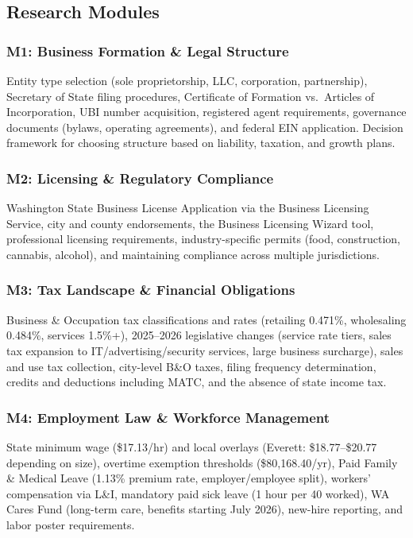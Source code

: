 \documentclass[11pt,letterpaper]{article}
\begin{document}
\subsection{Research Modules}

\subsubsection{M1: Business Formation \& Legal Structure}
Entity type selection (sole proprietorship, LLC, corporation, partnership), Secretary of State filing procedures, Certificate of Formation vs.\ Articles of Incorporation, UBI number acquisition, registered agent requirements, governance documents (bylaws, operating agreements), and federal EIN application. Decision framework for choosing structure based on liability, taxation, and growth plans.

\subsubsection{M2: Licensing \& Regulatory Compliance}
Washington State Business License Application via the Business Licensing Service, city and county endorsements, the Business Licensing Wizard tool, professional licensing requirements, industry-specific permits (food, construction, cannabis, alcohol), and maintaining compliance across multiple jurisdictions.

\subsubsection{M3: Tax Landscape \& Financial Obligations}
Business \& Occupation tax classifications and rates (retailing 0.471\%, wholesaling 0.484\%, services 1.5\%+), 2025--2026 legislative changes (service rate tiers, sales tax expansion to IT/advertising/security services, large business surcharge), sales and use tax collection, city-level B\&O taxes, filing frequency determination, credits and deductions including MATC, and the absence of state income tax.

\subsubsection{M4: Employment Law \& Workforce Management}
State minimum wage (\$17.13/hr) and local overlays (Everett: \$18.77--\$20.77 depending on size), overtime exemption thresholds (\$80,168.40/yr), Paid Family \& Medical Leave (1.13\% premium rate, employer/employee split), workers' compensation via L\&I, mandatory paid sick leave (1 hour per 40 worked), WA Cares Fund (long-term care, benefits starting July 2026), new-hire reporting, and labor poster requirements.
\end{document}
